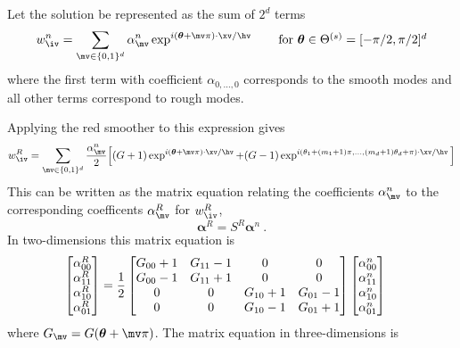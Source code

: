 \documentclass[12pt]{article}
\begin{document}
Let the solution be represented as the sum of $2^d$ terms
\[
  w_{\iv}^{n} = \sum_{\mv\in\{0,1\}^d } \alpha_{\mv}^{n} \exp^{ i (\thetav+\mv\pi)\cdot\xv/\hv } 
              \qquad\mbox{for  $\thetav\in\Theta^{(s)} = [-\pi/2,\pi/2]^d$}
\]
where the first term with coefficient $\alpha_{0,\ldots,0}$ corresponds to the smooth modes
and all other terms correspond to rough modes.

\newcommand{\alphav}{\boldsymbol{\alpha}}
Applying the red smoother to this expression gives
\[
  w_{\iv}^R  = \sum_{\mv\in\{0,1\}^d } 
{\alpha_{\mv}^{n} \over2}\Big[ (G+1)\exp^{ i (\thetav+\mv\pi)\cdot\xv/\hv } 
           + (G-1)\exp^{ i (\theta_1+(m_1+1)\pi,\ldots,(m_d+1)\theta_d+\pi)\cdot\xv/\hv } \Big]
\]
This can be written as the matrix equation relating the coefficients $\alpha_\mv^n$ to
the corresponding coefficents $\alpha_\mv^R$ for $w_{\iv}^R$,
\[
   \alphav^R  = S^R \alphav^n ~.
\]
In two-dimensions this matrix equation is
\begin{align*}
  \left[\begin{matrix} \alpha_{00}^{R} \\ \alpha_{11}^{R}  \\ 
                       \alpha_{10}^{R} \\ \alpha_{01}^{R}
                         \end{matrix}\right] 
 &= {1\over 2}
   \left[\begin{matrix} G_{00}+1 & G_{11}-1 & 0 & 0  \\
                        G_{00}-1 & G_{11}+1 & 0 & 0  \\
                        0 & 0 &  G_{10}+1 & G_{01}-1 \\
                        0 & 0 &  G_{10}-1 & G_{01}+1 \\
           \end{matrix}\right]
  \left[\begin{matrix} \alpha_{00}^{n} \\ \alpha_{11}^{n}  \\ 
                       \alpha_{10}^{n}  \\ \alpha_{01}^{n}  \end{matrix}\right] 
\end{align*}
where $G_\mv = G(\thetav+\mv\pi)$. 
The matrix equation in three-dimensions is
\newcommand{\zerov}{{\mathbf 0}}
\end{document}
